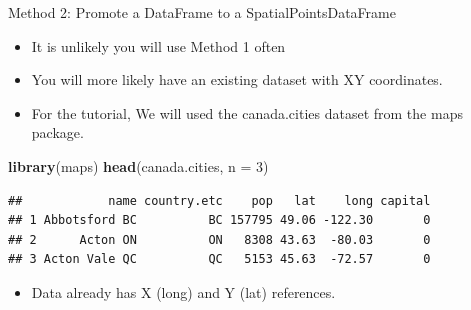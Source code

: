 \documentclass[10pt,ignorenonframetext,]{beamer}
\newenvironment{Shaded}{\begin{snugshade}}{\end{snugshade}}
\newcommand{\KeywordTok}[1]{\textcolor[rgb]{0.13,0.29,0.53}{\textbf{{#1}}}}
\newcommand{\DataTypeTok}[1]{\textcolor[rgb]{0.13,0.29,0.53}{{#1}}}
\newcommand{\DecValTok}[1]{\textcolor[rgb]{0.00,0.00,0.81}{{#1}}}
\newcommand{\NormalTok}[1]{{#1}}
\providecommand{\tightlist}{%
  \setlength{\itemsep}{0pt}\setlength{\parskip}{0pt}}
\begin{document}
\begin{frame}[fragile]{Method 2: Promote a DataFrame to a
SpatialPointsDataFrame}

\begin{itemize}
\tightlist
\item
  It is unlikely you will use Method 1 often
\item
  You will more likely have an existing dataset with XY coordinates.
\item
  For the tutorial, We will used the \alert{canada.cities} dataset from
  the \alert{maps} package.
\end{itemize}

\begin{Shaded}
\begin{Highlighting}[]
\KeywordTok{library}\NormalTok{(maps)}
\KeywordTok{head}\NormalTok{(canada.cities, }\DataTypeTok{n =} \DecValTok{3}\NormalTok{)}
\end{Highlighting}
\end{Shaded}

\begin{verbatim}
##            name country.etc    pop   lat    long capital
## 1 Abbotsford BC          BC 157795 49.06 -122.30       0
## 2      Acton ON          ON   8308 43.63  -80.03       0
## 3 Acton Vale QC          QC   5153 45.63  -72.57       0
\end{verbatim}

\begin{itemize}
\tightlist
\item
  Data already has X (long) and Y (lat) references.
\end{itemize}

\end{frame}
\end{document}
